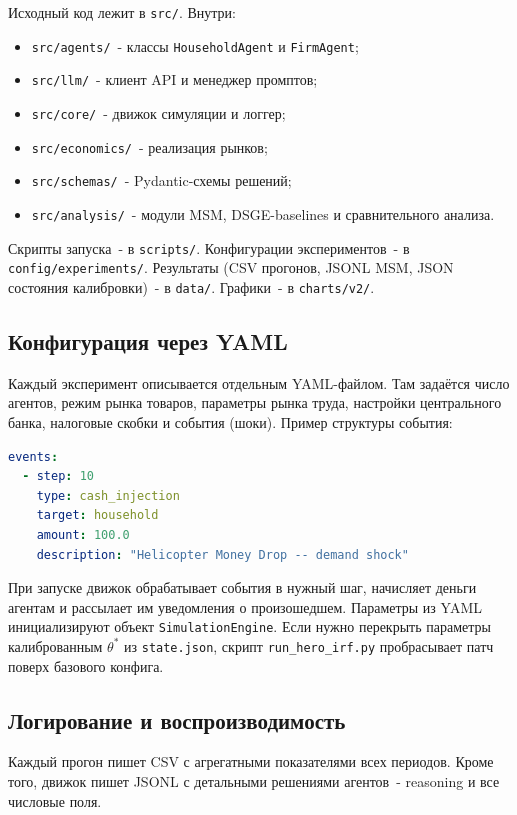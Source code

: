 \documentclass[12pt, a4paper]{article}
\begin{document}
Исходный код лежит в \texttt{src/}. Внутри:
\begin{itemize}
  \item \texttt{src/agents/}~- классы \texttt{HouseholdAgent} и \texttt{FirmAgent};
  \item \texttt{src/llm/}~- клиент API и менеджер промптов;
  \item \texttt{src/core/}~- движок симуляции и логгер;
  \item \texttt{src/economics/}~- реализация рынков;
  \item \texttt{src/schemas/}~- Pydantic-схемы решений;
  \item \texttt{src/analysis/}~- модули MSM, DSGE-baselines и сравнительного анализа.
\end{itemize}

Скрипты запуска~- в \texttt{scripts/}. Конфигурации экспериментов~- в \texttt{config/experiments/}. Результаты (CSV прогонов, JSONL MSM, JSON состояния калибровки)~- в \texttt{data/}. Графики~- в \texttt{charts/v2/}.

\subsection{Конфигурация через YAML}

Каждый эксперимент описывается отдельным YAML-файлом. Там задаётся число агентов, режим рынка товаров, параметры рынка труда, настройки центрального банка, налоговые скобки и события (шоки). Пример структуры события:

\begin{lstlisting}[language=yaml]
events:
  - step: 10
    type: cash_injection
    target: household
    amount: 100.0
    description: "Helicopter Money Drop -- demand shock"
\end{lstlisting}

При запуске движок обрабатывает события в нужный шаг, начисляет деньги агентам и рассылает им уведомления о произошедшем. Параметры из YAML инициализируют объект \texttt{SimulationEngine}. Если нужно перекрыть параметры калиброванным $\theta^*$ из \texttt{state.json}, скрипт \texttt{run\_hero\_irf.py} пробрасывает патч поверх базового конфига.

\subsection{Логирование и воспроизводимость}

Каждый прогон пишет CSV с агрегатными показателями всех периодов. Кроме того, движок пишет JSONL с детальными решениями агентов~- reasoning и все числовые поля.
\end{document}

